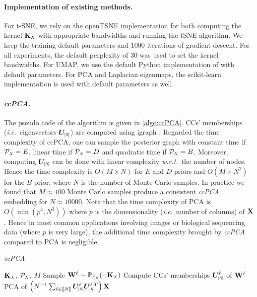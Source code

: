 \paragraph{Implementation of existing methods.} For t-SNE, we rely on the openTSNE implementation \citep{polivcar2019opentsne} for both computing the kernel $\mK_{\scaleto{X}{4pt}}$ with appropriate bandwidths and running the tSNE algorithm. We keep the training default parameters and $1000$ iterations of gradient descent. For all experiments, the default perplexity of $30$ was used to set the kernel bandwidths. For UMAP, we use the default Python implementation of \citep{mcinnes2018umap} with default parameters. For PCA and Laplacian eigenmaps, the scikit-learn implementation is used \citep{pedregosa2011scikit} with default parameters as well. 

\paragraph{\textit{ccPCA}.} The pseudo code of the algorithm is given in \cref{algo:ccPCA}. CCs' memberships (\textit{i.e.}\ eigenvectors $\bm{U}_{\scaleto{[R]}{5pt}}$) are computed using igraph \citep{csardi2006igraph}. Regarded the time complexity of ccPCA, one can sample the posterior graph with constant time if $\mathcal{P}_{\scaleto{X}{4pt}} = E$, linear time if $\mathcal{P}_{\scaleto{X}{4pt}} = D$ and quadratic time if $\mathcal{P}_{\scaleto{X}{4pt}} = B$. Moreover, computing $\bm{U}_{\scaleto{[R]}{5pt}}$ can be done with linear complexity \textit{w.r.t.}\ the number of nodes. Hence the time complexity is $O(M \times N)$ for $E$ and $D$ priors and $O(M \times N^2)$ for the $B$ prior, where $N$ is the number of Monte Carlo samples. In practice we found that $M\approx 100$ Monte Carlo samples produce a consistent \textit{ccPCA} embedding for $N \approx 10000$. Note that the time complexity of PCA is $O(\min(p^3,N^3))$ where $p$ is the dimensionality (\textit{i.e.}\ number of columns) of $\mathbf{X}$. Hence in most common applications involving images or biological sequencing data (where $p$ is very large), the additional time complexity brought by \textit{ccPCA} compared to PCA is negligible.

\vspace{0.5cm}

\begin{algorithm}[H]
  \caption{\textit{ccPCA}}
  \label{alg:3CPCA}
\begin{algorithmic}
   $\mK_{\scaleto{X}{4pt}}$, $\mathcal{P}_{\scaleto{X}{4pt}}$, $M$
  \STATE Sample $\W^{\ell} \sim  \mathbb{P}_{\scaleto{\mathcal{P}_{\scaleto{X}{4pt}}}{5pt}}(\cdot ; \mK_{\scaleto{X}{4pt}})$
  \STATE Compute CCs' memberships $\bm{U}^{\ell}_{\scaleto{[R]}{5pt}}$ of $\mathbf{W}^{\ell}$
  \ENDFOR
   PCA of $\left(N^{-1}\sum_{\ell \in \integ{N}} \bm{U}^{\ell}_{\scaleto{[R]}{5pt}} \bm{U}_{\scaleto{[R]}{5pt}}^{\ell\:T} \right) \X$
\end{algorithmic}
\label{algo:ccPCA}
\end{algorithm}

